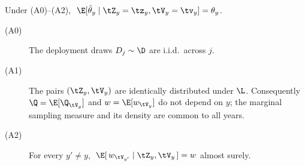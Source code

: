 


\begin{proposition}
Under \textnormal{(A0)--(A2)}, $\ \E[\hat\theta_y \mid \tZ_y = \tz_y,\tV_y = \tv_y] = \theta_y$.
\end{proposition}

\begin{description}
\item[(A0)] The deployment draws $D_{j} \sim \D$ are i.i.d.\ across $j$.
\item[(A1)] The pairs $(\tZ_y,\tV_y)$ are identically distributed under $\L$.
  Consequently $\Q = \E[\Q_{\tV_y}]$ and $w = \E[w_{\tV_y}]$ do not depend on $y$;
  the marginal sampling measure and its density are common to all years.
\item[(A2)] For every $y' \ne y$, $\ \E[\,w_{\tV_{y'}} \mid \tZ_y,\tV_y\,] = w$
  almost surely.
\end{description}

